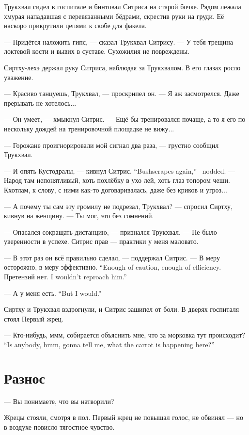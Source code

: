 Трукхвал сидел в госпитале и бинтовал Ситриса на старой бочке.
Рядом лежала хмурая нападавшая с перевязанными бёдрами, скрестив руки на груди.
Её наскоро прикрутили цепями к скобе для факела.

--- Придётся наложить гипс, --- сказал Трукхвал Ситрису.
--- У тебя трещина локтевой кости и вывих в суставе.
Сухожилия не повреждены.

Сиртху-лехэ держал руку Ситриса, наблюдая за Трукхвалом.
В его глазах росло уважение.

--- Красиво танцуешь, Трукхвал, --- проскрипел он.
--- Я аж засмотрелся.
Даже прерывать не хотелось...

--- Он умеет, --- хмыкнул Ситрис.
--- Ещё бы тренировался почаще, а то я его по нескольку дождей на тренировочной площадке не вижу...

--- Горожане проигнорировали мой сигнал два раза, --- грустно сообщил Трукхвал.

{--- И опять Кустодралы, --- кивнул Ситрис.}
{``Bushscrapes again,'' \Sitris\ nodded.}
--- Народ там непонятливый, хоть похлёбку в ухо лей, хоть глаз топором чеши.
Кхотлам, к слову, с ними как-то договаривалась, даже без криков и угроз...

--- А почему ты сам эту громилу не подрезал, Трукхвал? --- спросил Сиртху, кивнув на женщину.
--- Ты мог, это без сомнений.

--- Опасался сокращать дистанцию, --- признался Трукхвал.
--- Не было уверенности в успехе.
Ситрис прав --- практики у меня маловато.

--- В этот раз он всё правильно сделал, --- поддержал Ситрис.
{--- В меру осторожно, в меру эффективно.}
{``Enough of caution, enough of efficiency.}
{Претензий нет.}
{I wouldn't reproach him.''}

{--- А у меня есть.}
{``But I would.''}

Сиртху и Трукхвал вздрогнули, и Ситрис зашипел от боли.
В дверях госпиталя стоял Первый жрец.

{--- Кто-нибудь, ммм, собирается объяснить мне, что за морковка тут происходит?}
{``Is anybody, hmm, gonna tell me, what the carrot is happening here?''}

\section{Разнос}

--- Вы понимаете, что вы натворили?

Жрецы стояли, смотря в пол.
Первый жрец не повышал голос, не обвинял --- но в воздухе повисло тягостное чувство.

